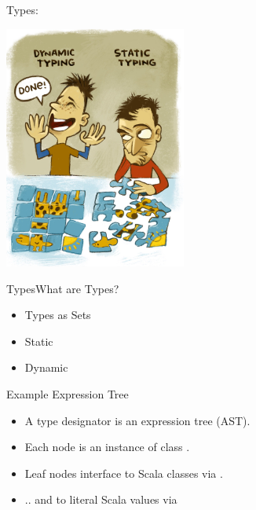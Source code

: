 \begin{frame}{Types: }
  \centering
  
    \includegraphics[height=8cm]{typing.png}
\end{frame}

\begin{frame}{Types}{What are Types?}
  \begin{itemize}
  \item Types as Sets
  \item Static
  \item Dynamic
  \end{itemize}
\end{frame}



\newsavebox\tdast
\begin{lrbox}{\tdast}
  \begin{minipage}{11cm}
    
  \end{minipage}
\end{lrbox}


\begin{frame}{Example  Expression Tree}
  \usebox\tdast

  \medskip

  \centering

  \scalebox{0.7}{}
  \begin{itemize}
  \item A type designator is an expression tree (AST).
  \item Each node is an instance of class .
  \item Leaf nodes interface to Scala classes via .
  \item .. and to literal Scala values via 
  \end{itemize}
\end{frame}


